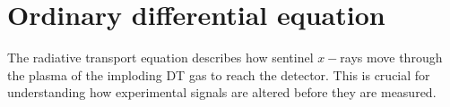 \section{\label{sec:ODE}Ordinary differential equation}

The radiative transport equation describes how sentinel $x-$rays move through the plasma of the imploding DT gas to reach the detector. This is crucial for understanding how experimental signals are altered before they are measured.





\endinput %